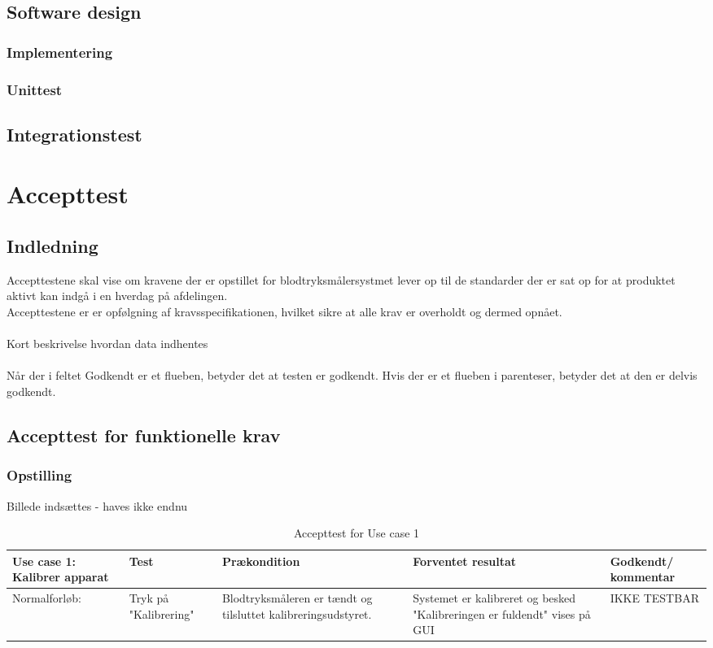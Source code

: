 \section{Software design}
\subsection{Implementering}
\subsection{Unittest}
\section{Integrationstest}
\chapter{Accepttest}
\section{Indledning}
Accepttestene skal vise om kravene der er opstillet for blodtryksmålersystmet lever op til de standarder der er sat op for at produktet aktivt kan indgå i en hverdag på afdelingen.\\
Accepttestene er er opfølgning af kravsspecifikationen, hvilket sikre at alle krav er overholdt og dermed opnået.\\\\
Kort beskrivelse hvordan data indhentes\\\\
Når der i feltet Godkendt er et flueben, betyder det at testen er godkendt. Hvis der er et flueben i parenteser, betyder det at den er delvis godkendt. \\

\section{Accepttest for funktionelle krav}
\subsection{Opstilling}
Billede indsættes - haves ikke endnu

\begin{table}[H]
\caption{Accepttest for Use case 1}\label{tab:tabel8}
\begin{tabular}{|>{\raggedright\arraybackslash}p{2.5cm}| >{\raggedright\arraybackslash}p{2.9cm} | >{\raggedright\arraybackslash}p{2.9cm} | >{\raggedright\arraybackslash}p{2.9cm} | >{\raggedright\arraybackslash}p{2.8cm} |}
   \hline
   \textbf{Use case 1: Kalibrer apparat} &\textbf{Test}& \textbf{Prækondition} & \textbf{Forventet resultat} & \textbf{Godkendt/ kommentar}\\ \hline
   Normalforløb:& Tryk på "Kalibrering" & Blodtryksmåleren er tændt og tilsluttet kalibreringsudstyret. & Systemet er kalibreret og besked "Kalibreringen er fuldendt" vises på GUI & IKKE TESTBAR\\\hline
\end{tabular}
\end{table}

